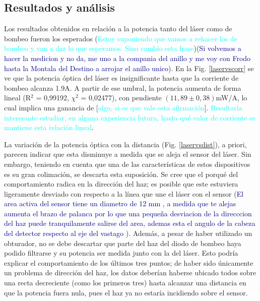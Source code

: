 \documentclass[10pt, a4paper]{article}%
\begin{document}
\begin{multicols}{2}

\section{Resultados y análisis}

Los resultados obtenidos en relación a la potencia tanto del láser como de bombeo fueron los esperados (\textcolor{cyan}{Estoy suponiendo que vamos a rehacer los de bombeo y van a dar lo que esperamos. Sino cambio esta frase})({\textcolor{DarkBlue}{Si volvemos a hacer la medicion y no da, me uno a la compania del anillo y me voy con Frodo hasta la Montala del Destino a arrojar el anillo unico}}). En la Fig. \ref{laservscorr} se ve que la potencia óptica del láser es insignificante hasta que la corriente de bombeo alcanza 1.9A. A partir de ese umbral, la potencia aumenta de forma lineal  (R$^2$ = 0,99192, $\chi^2$ = 0,02477), con pendiente $ (11,89 \pm 0,38)$mW/A, lo cual implica una ganancia de [\textcolor{cyan}{algo, si es que vale esta afirmación}]. \textcolor{cyan}{Resultaría interesante estudiar, en alguna experiencia futura, hasta qué valor de corriente se mantiene esta relación lineal}. 

La variación de la potencia óptica con la distancia (Fig. \ref{laservsdist}), a priori, parecen indicar que esta disminuye a medida que se aleja el sensor del láser. Sin embargo, teniendo en cuenta que una de las características de estos dispositivos es su gran colimación, se descarta esta suposición. Se cree que el porqué del comportamiento radica en la dirección del haz; es posible que este estuviera ligeramente desviado con respecto a la línea que une el láser con el sensor (\textcolor{DarkBlue}{El area activa del sensor tiene un diametro de 12 mm , a medida que te alejas aumenta el brazo de palanca por lo que una pequeña desviacion de la direcccion del haz puede tranquilamente salirse del area, ademas esta el angulo de la cabeza del detector respecto al eje del vastago }). Además, a pesar de haber utilizado un obturador, no se debe descartar que parte del haz del diodo de bombeo haya podido filtrarse y su potencia ser medida junto con la del láser. Esto podría explicar el comportamiento de los últimos tres puntos; de haber sido únicamente un problema de dirección del haz, los datos deberían haberse ubicado todos sobre una recta decreciente (como los primeros tres) hasta alcanzar una distancia en que la potencia fuera nula, pues el haz ya no estaría incidiendo sobre el sensor. 


\end{multicols}
\end{document}
